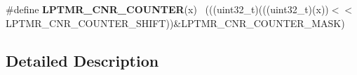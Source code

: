 \begin{DoxyCompactItemize}
\item 
\hypertarget{group___l_p_t_m_r___register___masks_ga2acac25722b0527dbb388488e26850f3}{}\#define {\bfseries L\+P\+T\+M\+R\+\_\+\+C\+N\+R\+\_\+\+C\+O\+U\+N\+T\+E\+R}(x)                                      ~(((uint32\+\_\+t)(((uint32\+\_\+t)(x))$<$$<$L\+P\+T\+M\+R\+\_\+\+C\+N\+R\+\_\+\+C\+O\+U\+N\+T\+E\+R\+\_\+\+S\+H\+I\+F\+T))\&L\+P\+T\+M\+R\+\_\+\+C\+N\+R\+\_\+\+C\+O\+U\+N\+T\+E\+R\+\_\+\+M\+A\+S\+K)\label{group___l_p_t_m_r___register___masks_ga2acac25722b0527dbb388488e26850f3}

\end{DoxyCompactItemize}


\subsection{Detailed Description}
